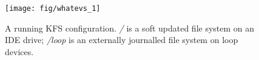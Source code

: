 \begin{figure}[htb]
  \centering
  \texttt{[image: fig/whatevs\_1]}
  \caption{A running KFS configuration. {\it/} is a soft updated
    file system on an IDE drive; {\it/loop} is an externally journalled
    file system on loop devices.}
  \label{fig:kfs-graph}
\end{figure}
